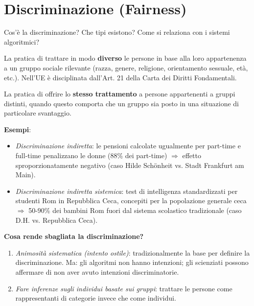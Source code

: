 \documentclass[a4paper,11pt]{article}
\begin{document}
\section{Discriminazione (Fairness)}

\begin{domanda}
Cos'\`{e} la discriminazione? Che tipi esistono? Come si relaziona con i sistemi algoritmici?
\end{domanda}

\begin{definizione}
La pratica di trattare in modo \textbf{diverso} le persone in base alla loro appartenenza a un gruppo sociale rilevante (razza, genere, religione, orientamento sessuale, et\`{a}, etc.). Nell'UE \`{e} disciplinata dall'Art. 21 della Carta dei Diritti Fondamentali.
\end{definizione}

\begin{definizione}
La pratica di offrire lo \textbf{stesso trattamento} a persone appartenenti a gruppi distinti, quando questo comporta che un gruppo sia posto in una situazione di particolare svantaggio.
\end{definizione}

\textbf{Esempi}:
\begin{itemize}
  \item \textit{Discriminazione indiretta}: le pensioni calcolate ugualmente per part-time e full-time penalizzano le donne (88\% dei part-time) $\Rightarrow$ effetto sproporzionatamente negativo (caso Hilde Sch\"{o}nheit vs. Stadt Frankfurt am Main).
  \item \textit{Discriminazione indiretta sistemica}: test di intelligenza standardizzati per studenti Rom in Repubblica Ceca, concepiti per la popolazione generale ceca $\Rightarrow$ 50-90\% dei bambini Rom fuori dal sistema scolastico tradizionale (caso D.H. vs. Repubblica Ceca).
\end{itemize}

\textbf{Cosa rende sbagliata la discriminazione?}
\begin{enumerate}
  \item \emph{Animosit\`{a} sistematica (intento ostile)}: tradizionalmente la base per definire la discriminazione. Ma: gli algoritmi non hanno intenzioni; gli scienziati possono affermare di non aver avuto intenzioni discriminatorie.
  \item \emph{Fare inferenze sugli individui basate sui gruppi}: trattare le persone come rappresentanti di categorie invece che come individui.
\end{enumerate}
\end{document}
